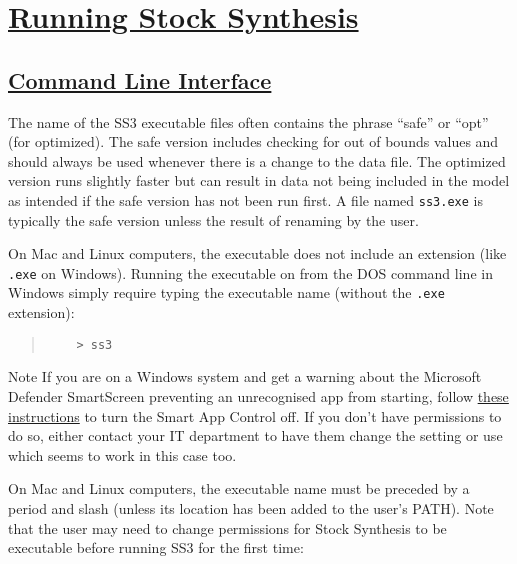 \section[Running Stock Synthesis]{\protect\hyperref[sec:RunningSS3]{Running Stock Synthesis}} \label{sec:RunningSS3}

\hypertarget{CommandLine}{}
\subsection[Command Line Interface]{\protect\hyperlink{CommandLine}{Command Line Interface}}
The name of the SS3 executable files often contains the phrase ``safe'' or ``opt'' (for optimized). The safe version includes checking for out of bounds values and should always be used whenever there is a change to the data file. The optimized version runs slightly faster but can result in data not being included in the model as intended if the safe version has not been run first. A file named \texttt{ss3.exe} is typically the safe version unless the result of renaming by the user.

On Mac and Linux computers, the executable does not include an extension (like \texttt{.exe} on Windows).
Running the executable on from the DOS command line in Windows simply require typing the executable name (without the \texttt{.exe} extension):
\begin{quote}
	\begin{verbatim}
	> ss3
	\end{verbatim}
\end{quote}

\begin{mybox}{Note}
If you are on a Windows system and get a warning about the Microsoft Defender SmartScreen preventing an unrecognised app from starting, follow \href{https://answers.microsoft.com/en-us/windows/forum/all/how-to-change-the-mode-of-smart-app-control-from/399a276f-5585-40fe-b72d-c014cac82b32}{these instructions} to turn the Smart App Control off. If you don't have permissions to do so, either contact your IT department to have them change the setting or use  which seems to work in this case too.
\end{mybox}

On Mac and Linux computers, the executable name must be preceded by a period and slash (unless its location has been added to the user's PATH). Note that the user may need to change permissions for Stock Synthesis to be executable before running SS3 for the first time:

